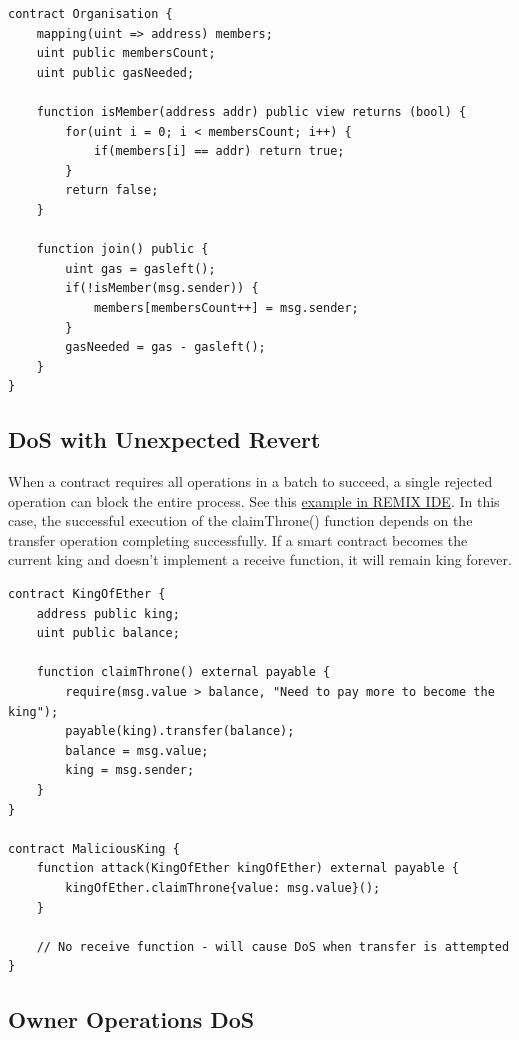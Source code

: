 \documentclass[12pt]{article}
\begin{document}
\begin{lstlisting}[language=Solidity, caption=DoS with Block Gas Limit Example]
contract Organisation {
    mapping(uint => address) members;
    uint public membersCount;
    uint public gasNeeded;

    function isMember(address addr) public view returns (bool) {
        for(uint i = 0; i < membersCount; i++) {
            if(members[i] == addr) return true;
        }
        return false;
    }

    function join() public {
        uint gas = gasleft();
        if(!isMember(msg.sender)) {
            members[membersCount++] = msg.sender;
        }
        gasNeeded = gas - gasleft();
    }
}
\end{lstlisting}

\subsection{DoS with Unexpected Revert}

When a contract requires all operations in a batch to succeed, a single rejected operation can block the entire process. See this \href{https://remix.ethereum.org/?#activate=solidity&url=https://github.com/radovluk/unbreakable-vault/contracts/DoS02.sol&lang=en&optimize=false&runs=200&evmVersion=null&version=soljson-v0.8.28+commit.7893614a.js}{example in REMIX IDE}. In this case, the successful execution of the claimThrone() function depends on the transfer operation completing successfully. If a smart contract becomes the current king and doesn't implement a receive function, it will remain king forever.

\begin{lstlisting}[language=Solidity, caption=DoS with Revert Example]
contract KingOfEther {
    address public king;
    uint public balance;

    function claimThrone() external payable {
        require(msg.value > balance, "Need to pay more to become the king");
        payable(king).transfer(balance);
        balance = msg.value;
        king = msg.sender;
    }
}

contract MaliciousKing {    
    function attack(KingOfEther kingOfEther) external payable {
        kingOfEther.claimThrone{value: msg.value}();
    }

    // No receive function - will cause DoS when transfer is attempted
}
\end{lstlisting}

\subsection{Owner Operations DoS}
\end{document}

